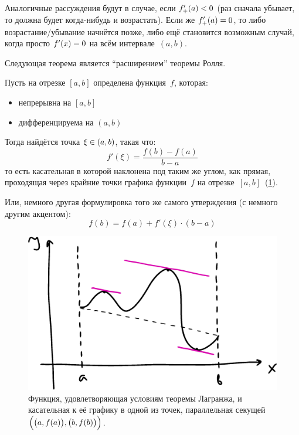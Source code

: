 \documentclass[a4paper,12pt]{article}
\begin{document}
  Аналогичные рассуждения будут в случае, если $f'_+(a) \hm< 0$ (раз сначала убывает, то должна будет когда-нибудь и возрастать).
  Если же $f'_+(a) \hm= 0$, то либо возрастание/убывание начнётся позже, либо ещё становится возможным случай, когда просто $f'(x) \hm= 0$ на всём интервале~$(a, b)$.

  Следующая теорема является ``расширением'' теоремы Ролля.

  \begin{theorem}\label{theo:largange}
    Пусть на отрезке $[a, b]$ определена функция~$f$, которая:
    \begin{itemize}
      \item непрерывна на $[a, b]$
      \item дифференцируема на $(a, b)$
    \end{itemize}

    Тогда найдётся точка $\xi \hm\in (a, b)$, такая что:
    \[
      f'(\xi) = \frac{f(b) - f(a)}{b - a}
    \]
    то есть касательная в которой наклонена под таким же углом, как прямая, проходящая через крайние точки графика функции~$f$ на отрезке~$[a, b]$~(\ref{fig:largange}).

    Или, немного другая формулировка того же самого утверждения (с немного другим акцентом):
    \[
      f(b) = f(a) + f'(\xi) \cdot (b - a)
    \]
  \end{theorem}

  \begin{figure}
      \centering
      
      \includegraphics[width=0.8\linewidth]{images/largange}
      
      \caption{Функция, удовлетворяющая условиям теоремы Лагранжа, и касательная к её графику в одной из точек, параллельная секущей $\Bigl(\bigl(a, f(a)\bigr), \bigl(b, f(b)\bigr)\Bigr)$.}
      \label{fig:largange}
  \end{figure}
\end{document}
